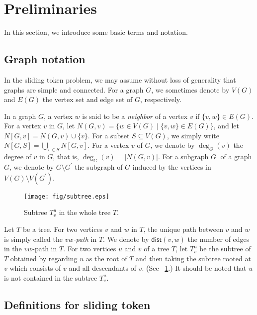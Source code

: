 \documentclass{llncs}
\newcommand{\msize}[1]{{\left|#1\right|}}
\newcommand{\Nei}[2]{N(#1,#2)}
\newcommand{\Neiclosed}[2]{N[#1, #2]}
\newcommand{\Tsub}[2]{T_{#1}^{#2}}
\newcommand{\dist}{\mathsf{dist}}
\newcounter{two}
\begin{document}
\section{Preliminaries}

In this section, we introduce some basic terms and notation. 

\subsection{Graph notation}

In the {\sc sliding token} problem, 
we may assume without loss of generality that graphs are simple and connected.
For a graph $G$, we sometimes denote by $V(G)$ and $E(G)$ the vertex set and edge set of $G$, respectively. 

	In a graph $G$, a vertex $w$ is said to be a {\em neighbor} of a vertex $v$ if $\{v,w \} \in E(G)$. 
	For a vertex $v$ in $G$, let $\Nei{G}{v} = \{w \in V(G) \mid \{v, w \}\in E(G) \}$, and let $\Neiclosed{G}{v} = \Nei{G}{v}\cup\{v\}$.
	For a subset $S \subseteq V(G)$, we simply write $\Neiclosed{G}{S} = \bigcup_{v \in S} \Neiclosed{G}{v}$. 
	For a vertex $v$ of $G$, we denote by $\deg_{G}(v)$ the degree of $v$ in $G$, that is, $\deg_{G}(v) = \msize{\Nei{G}{v}}$.
	For a subgraph $G^\prime$ of a graph $G$, we denote by $G \setminus G^\prime$ the subgraph of $G$ induced by the vertices in $V(G) \setminus V(G^\prime)$. 

\begin{figure}[t]
\begin{center}
\texttt{[image: fig/subtree.eps]}
\end{center}
\vspace{-1em}
\caption{Subtree $\Tsub{v}{u}$ in the whole tree $T$.}
\label{fig:subtree}
\end{figure}

	Let $T$ be a tree. 
	For two vertices $v$ and $w$ in $T$, the unique path between $v$ and $w$ is simply called the {\em $vw$-path} in $T$. 
	We denote by $\dist(v, w)$ the number of edges in the $vw$-path in $T$.
	For two vertices $u$ and $v$ of a tree $T$, let $\Tsub{v}{u}$ be the subtree of $T$ obtained by regarding $u$ as the root of $T$ and then taking the subtree rooted at $v$ which consists of $v$ and all descendants of $v$.
(See \figurename~\ref{fig:subtree}.)
	It should be noted that $u$ is not contained in the subtree $\Tsub{v}{u}$. 

\subsection{Definitions for {\sc sliding token}}
\end{document}
